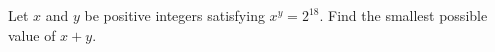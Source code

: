 Let $x$ and $y$ be positive integers satisfying $x^y=2^{18}$. Find the smallest possible value of $x+y$.
